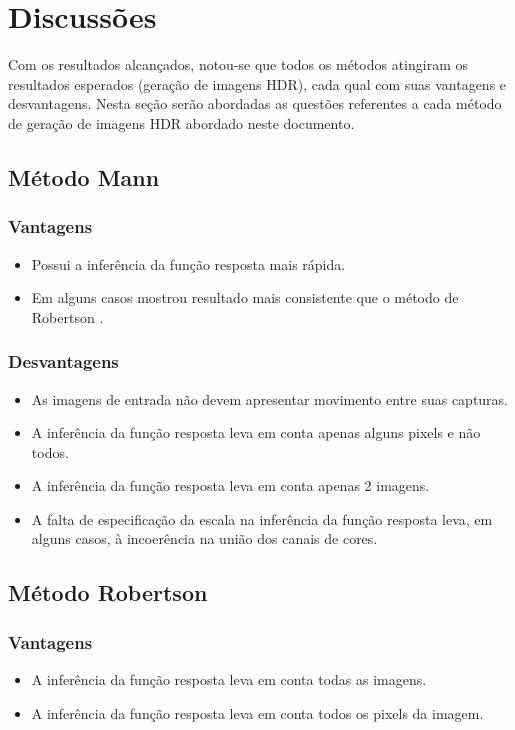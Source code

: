 \section{Discussões} \label{discussoes}

Com os resultados alcançados, notou-se que todos os métodos atingiram os resultados esperados (geração de imagens HDR), cada qual com suas vantagens e desvantagens. Nesta seção serão abordadas as questões referentes a cada método de geração de imagens HDR abordado neste documento.

\subsection{Método Mann} \label{discussaoMann}
\subsubsection{Vantagens}
\begin{itemize}
	\item Possui a inferência da função resposta mais rápida.
	\item Em alguns casos mostrou resultado mais consistente que o método de Robertson \etal \cite{robertson}.
\end{itemize}
\subsubsection{Desvantagens}
\begin{itemize}
	\item As imagens de entrada não devem apresentar movimento entre suas capturas.
	\item A inferência da função resposta leva em conta apenas alguns pixels e não todos.
	\item A inferência da função resposta leva em conta apenas 2 imagens.
	\item A falta de especificação da escala na inferência da função resposta leva, em alguns casos, à incoerência na união dos canais de cores.
\end{itemize}


\subsection{Método Robertson} \label{discussaoRobertson}
\subsubsection{Vantagens}
\begin{itemize}
	\item A inferência da função resposta leva em conta todas as imagens.
	\item A inferência da função resposta leva em conta todos os pixels da imagem.
\end{itemize}
